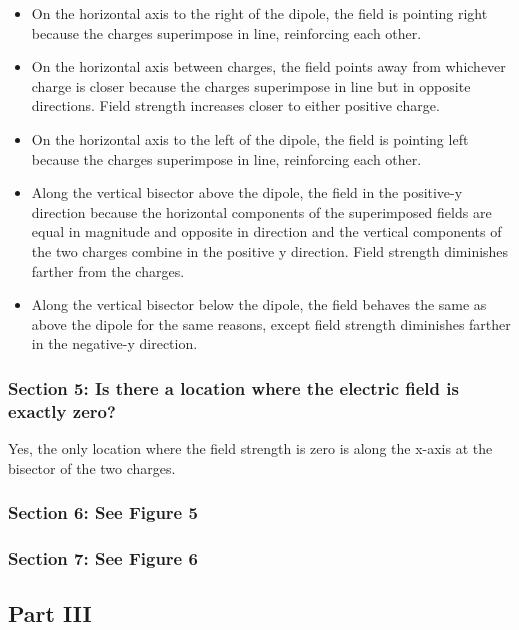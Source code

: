 \documentclass{article}
\begin{document}
\begin{itemize}
	\item On the horizontal axis to the right of the dipole, the field is pointing right
		because the charges superimpose in line, reinforcing each other.
	\item On the horizontal axis between charges, the field points away from whichever charge
		is closer because the charges superimpose in line but in opposite directions. Field strength increases
		closer to either positive charge.
	\item On the horizontal axis to the left of the dipole, the field is pointing left
		because the charges superimpose in line, reinforcing each other.
	\item Along the vertical bisector above the dipole, the field in the positive-y direction because the horizontal components of the superimposed fields are equal in magnitude
		and opposite in direction and the vertical components of the two charges combine in the positive y direction.
		Field strength diminishes farther from the charges.
	\item Along the vertical bisector below the dipole, the field behaves the same as above the dipole for the
		same reasons, except field strength diminishes farther in the negative-y direction.
\end{itemize}

\subsubsection{Section 5: Is there a location where the electric field is exactly zero?}%
\label{ssub:is_there_a_location_where_the_electric_field_is_exactly_zero_}
Yes, the only location where the field strength is zero is along the x-axis
at the bisector of the two charges.

\subsubsection{Section 6: See Figure 5}%
\label{ssub:section_6_see_figure_5}

\subsubsection{Section 7: See Figure 6}%
\label{ssub:section_6_see_figure_5}


\subsection{Part III}%
\label{sub:part_iii}
\end{document}
